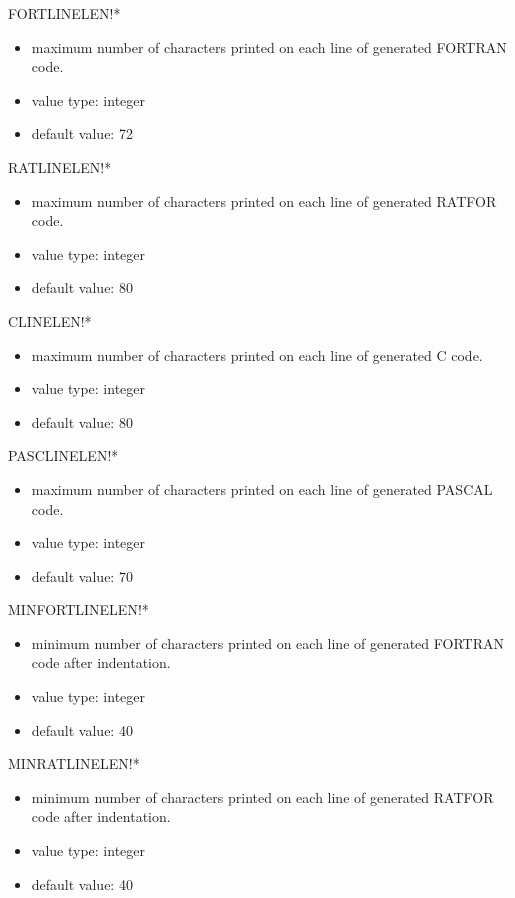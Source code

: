 \begin{describe}{FORTLINELEN!*}
\begin{itemize}
\item maximum number of characters printed on each line of generated FORTRAN
code.
\item value type:  integer
\item default value:  72
\end{itemize}
\end{describe}
\begin{describe}{RATLINELEN!*}
\begin{itemize}
\item maximum number of characters printed on each line of generated RATFOR
code.
\item value type:  integer
\item default value:  80
\end{itemize}
\end{describe}
\begin{describe}{CLINELEN!*}
\begin{itemize}
\item maximum number of characters printed on each line of generated C code.
\item value type:  integer
\item default value:  80
\end{itemize} 
\end{describe} 
\begin{describe}{PASCLINELEN!*}
\begin{itemize}
\item maximum number of characters printed on each line of generated PASCAL code.
\item value type:  integer
\item default value:  70
\end{itemize}
\end{describe}
\begin{describe}{MINFORTLINELEN!*}
\begin{itemize}
\item minimum number of characters printed on each line of generated FORTRAN
code after indentation.
\item value type:  integer
\item default value:  40
\end{itemize} 
\end{describe} 
\begin{describe}{MINRATLINELEN!*}
\begin{itemize}
\item minimum number of characters printed on each line of generated RATFOR
code after indentation.
\item value type:  integer
\item default value:  40
\end{itemize} 
\end{describe} 
